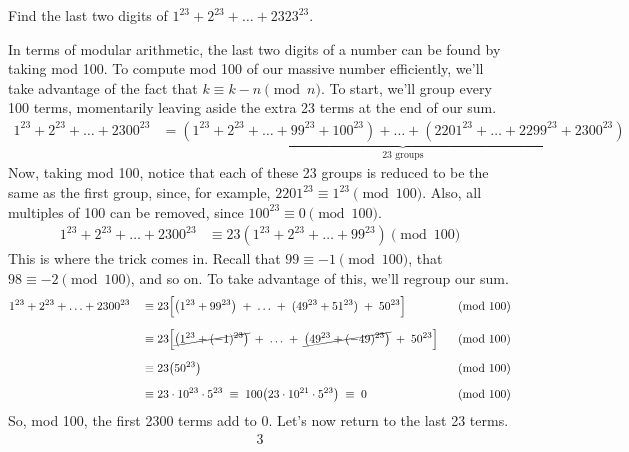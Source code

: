 \begin{problem}
    Find the last two digits of $1^{23} + 2^{23} + \ldots + 2323^{23}$.
\end{problem}

\begin{solution}[76]
    In terms of modular arithmetic, the last two digits of a number can be found by taking mod 100. To compute mod 100 of our massive number efficiently, we'll take advantage of the fact that $k \equiv k - n \pmod n$. To start, we'll group every 100 terms, momentarily leaving aside the extra 23 terms at the end of our sum.
    \begin{align*}
        1^{23} + 2^{23} + \ldots + 2300^{23} &= \underbrace{(1^{23} + 2^{23} + \ldots + 99^{23} + 100^{23}) + \ldots + (2201^{23}+\ldots+2299^{23}+2300^{23})}_{\text{23 groups}}
    \end{align*}
    Now, taking mod 100, notice that each of these 23 groups is reduced to be the same as the first group, since, for example, $2201^{23} \equiv 1^{23} \pmod {100}$. Also, all multiples of 100 can be removed, since \(100^{23} \equiv 0 \pmod {100}\).
    \begin{align*}
        1^{23} + 2^{23} + \ldots + 2300^{23} &\equiv 23\left(1^{23} + 2^{23} + \ldots + 99^{23}\right) \pmod {100}
    \end{align*}
    This is where the trick comes in. Recall that $99 \equiv -1 \pmod {100}$, that $98 \equiv -2 \pmod {100}$, and so on. To take advantage of this, we'll regroup our sum.
    \begin{alignat*}{3}
        1^{23} + 2^{23} + \ldots + 2300^{23}
        &&\;\equiv\;&
        23\Big[\bigl(1^{23} + 99^{23}\bigr) \;+\; \ldots \;+\; (49^{23} + 51^{23}) \;+\; 50^{23}\Big]
        &\;\pmod{100}\\[6pt]
        &&\;\equiv\;&
        23\Big[\cancel{\bigl(1^{23} + (-1)^{23}\bigr)} \;+\; \ldots \;+\; \cancel{\bigl(49^{23} + (-49)^{23}\bigr)} \;+\; 50^{23}\Big]
        &\;\pmod{100}\\[6pt]
        &&\;\equiv\;&
        23 \big( 50^{23} \big)
        &\;\pmod{100}\\[6pt]
        &&\;\equiv\;&
        23\cdot10^{23}\cdot5^{23} \;\equiv\;  100\big( 23\cdot10^{21}\cdot5^{23} \big) \;\equiv\; 0
        &\;\pmod{100}
    \end{alignat*}
    So, mod 100, the first 2300 terms add to 0. Let's now return to the last 23 terms.
    \begin{alignat*}{3}

\end{alignat*}
\end{solution}
